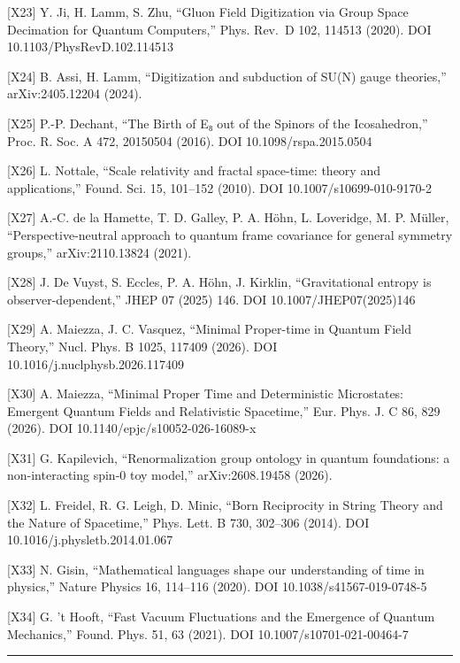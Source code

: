 \documentclass[
  a4paper,
]{ltjsarticle}
\begin{document}
{[}X23{]} Y. Ji, H. Lamm, S. Zhu, ``Gluon Field Digitization via Group
Space Decimation for Quantum Computers,'' Phys. Rev.~D 102, 114513
(2020). DOI 10.1103/PhysRevD.102.114513

{[}X24{]} B. Assi, H. Lamm, ``Digitization and subduction of SU(N) gauge
theories,'' arXiv:2405.12204 (2024).

{[}X25{]} P.-P. Dechant, ``The Birth of E₈ out of the Spinors of the
Icosahedron,'' Proc. R. Soc. A 472, 20150504 (2016). DOI
10.1098/rspa.2015.0504

{[}X26{]} L. Nottale, ``Scale relativity and fractal space-time: theory
and applications,'' Found. Sci. 15, 101--152 (2010). DOI
10.1007/s10699-010-9170-2

{[}X27{]} A.-C. de la Hamette, T. D. Galley, P. A. Höhn, L. Loveridge,
M. P. Müller, ``Perspective-neutral approach to quantum frame covariance
for general symmetry groups,'' arXiv:2110.13824 (2021).

{[}X28{]} J. De Vuyst, S. Eccles, P. A. Höhn, J. Kirklin,
``Gravitational entropy is observer-dependent,'' JHEP 07 (2025) 146. DOI
10.1007/JHEP07(2025)146

{[}X29{]} A. Maiezza, J. C. Vasquez, ``Minimal Proper-time in Quantum
Field Theory,'' Nucl. Phys. B 1025, 117409 (2026). DOI
10.1016/j.nuclphysb.2026.117409

{[}X30{]} A. Maiezza, ``Minimal Proper Time and Deterministic
Microstates: Emergent Quantum Fields and Relativistic Spacetime,'' Eur.
Phys. J. C 86, 829 (2026). DOI 10.1140/epjc/s10052-026-16089-x

{[}X31{]} G. Kapilevich, ``Renormalization group ontology in quantum
foundations: a non-interacting spin-0 toy model,'' arXiv:2608.19458
(2026).

{[}X32{]} L. Freidel, R. G. Leigh, D. Minic, ``Born Reciprocity in
String Theory and the Nature of Spacetime,'' Phys. Lett. B 730, 302--306
(2014). DOI 10.1016/j.physletb.2014.01.067

{[}X33{]} N. Gisin, ``Mathematical languages shape our understanding of
time in physics,'' Nature Physics 16, 114--116 (2020). DOI
10.1038/s41567-019-0748-5

{[}X34{]} G. 't Hooft, ``Fast Vacuum Fluctuations and the Emergence of
Quantum Mechanics,'' Found. Phys. 51, 63 (2021). DOI
10.1007/s10701-021-00464-7

\begin{center}\rule{0.5\linewidth}{0.5pt}\end{center}
\end{document}
